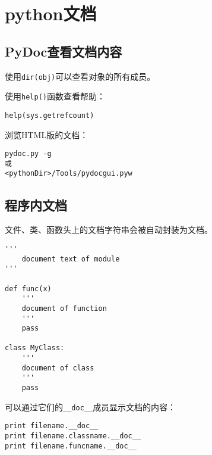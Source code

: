 
\chapter{python文档}

\section{PyDoc查看文档内容}

使用\verb|dir(obj)|可以查看对象的所有成员。

使用\verb|help()|函数查看帮助：

\begin{lstlisting}
help(sys.getrefcount)
\end{lstlisting}

浏览HTML版的文档：

\begin{verbatim}
pydoc.py -g
或
<pythonDir>/Tools/pydocgui.pyw
\end{verbatim}

\section{程序内文档}

文件、类、函数头上的文档字符串会被自动封装为文档。

\begin{lstlisting}
'''
    document text of module
'''

def func(x)
	'''
	document of function
	'''
	pass

class MyClass:
	'''
	document of class
	'''
	pass
\end{lstlisting}

可以通过它们的\verb|__doc__|成员显示文档的内容：

\begin{lstlisting}
print filename.__doc__
print filename.classname.__doc__
print filename.funcname.__doc__
\end{lstlisting}

